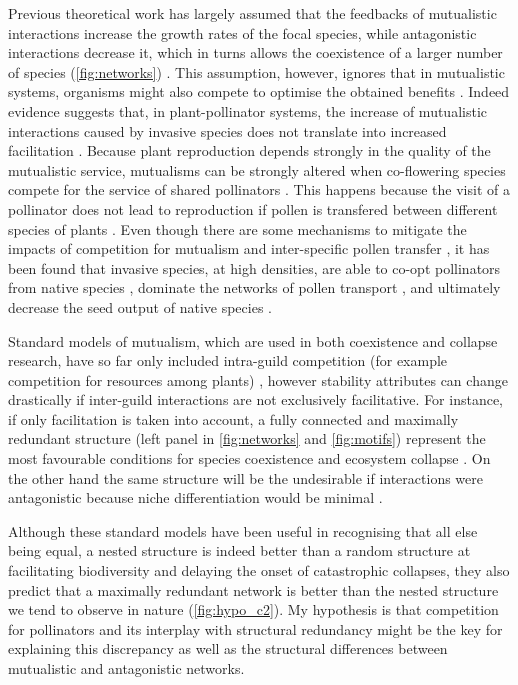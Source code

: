 \documentclass[a4paper]{article}
\begin{document}
Previous theoretical work has largely assumed that the feedbacks of mutualistic interactions increase the growth rates of the focal species, while antagonistic interactions decrease it, which in turns allows the coexistence of a larger number of species (\autoref{fig:networks}) \autocite{Moeller2004, Bastolla2009}.
This assumption, however, ignores that in mutualistic systems, organisms might also compete to optimise the obtained benefits \autocite{Levin1970}.
Indeed evidence suggests that, in plant-pollinator systems, the increase of mutualistic interactions caused by invasive species does not translate into increased facilitation \autocite{Lopezaraiza-Mikel2007}.
Because plant reproduction depends strongly in the quality of the mutualistic service, mutualisms can be strongly altered when co-flowering species compete for the service of shared pollinators \autocite{Sargent2008, Mitchell2009}.
This happens because the visit of a pollinator does not lead to reproduction if pollen is transfered between different species of plants \autocite{Morales2008}.
Even though there are some mechanisms to mitigate the impacts of competition for mutualism and inter-specific pollen transfer \autocite{Waser1979, Ghazoul2006, Bartomeus2008a}, it has been found that invasive species, at high densities, are able to co-opt pollinators from native species \autocite{Pysek2011}, dominate the networks of pollen transport \autocite{Lopezaraiza-Mikel2007, Alarcon2010}, and ultimately decrease the seed output of native species \autocite{Munoz2008}.

Standard models of mutualism, which are used in both coexistence and collapse research, have so far only included intra-guild competition (for example competition for resources among plants) \autocite{Lever2014, Bastolla2009}, however stability attributes can change drastically if inter-guild interactions are not exclusively facilitative.
For instance, if only facilitation is taken into account, a fully connected and maximally redundant structure (left panel in \autoref{fig:networks} and \ref{fig:motifs}) represent the most favourable conditions for species coexistence and ecosystem collapse \autocite{Bastolla2009, Lever2014}.
On the other hand the same structure will be the undesirable if interactions were antagonistic because niche differentiation would be minimal \autocite{Stouffer2010}.

Although these standard models have been useful in recognising that all else being equal, a nested structure is indeed better than a random structure at facilitating biodiversity and delaying the onset of catastrophic collapses, they also predict that a maximally redundant network is better than the nested structure we tend to observe in nature (\autoref{fig:hypo_c2}).
My hypothesis is that competition for pollinators and its interplay with structural redundancy might be the key for explaining this discrepancy as well as the structural differences between mutualistic and antagonistic networks.
\end{document}
